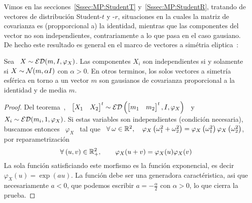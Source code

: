 Vimos   en   las  secciones~\ref{Sssec:MP:StudentT}   y~\ref{Sssec:MP:StudentR},
tratando de  vectores de  distribuci\'on Student-$t$ y  -$r$, situaciones  en la
cuales la matriz  de covarianza es (propporcional a)  la identidad, mientras que
las componentes del  vector no son independientes, contrariamente  a lo que pasa
en el caso gausiano.  De hecho este resultado es general en el marco de vectores
a sim\'etria eliptica~\cite{BilBre99, Max67}:
%
\begin{teorema}\label{Teo:MP:MaxwellHershell}
  Sea \ $X \sim \mathcal{ED}(m,I,\varphi_X)$. Las componentes $X_i$ son independientes si
  y solamente si $X  \sim \mathcal{N}(m, \alpha I)$ con $\alpha >  0$. En otros terminos,
  los  solos vectores  a  simetr\'ia esf\'erica  en  torno a  un  vector $m$  son
  gausianos de covarianza proporcional a la identidad y de media $m$.
\end{teorema}
%
\begin{proof}
  Del teorema~\cite{Teo:MP:TranformacionAfinEliptica},  \ $\begin{bmatrix} X_1 &
    X_2    \end{bmatrix}^t     \sim    \mathcal{ED}\left(    \begin{bmatrix}     m_1    &
      m_2 \end{bmatrix}^t, I, \varphi_X \right)$ \ y  \ $X_i \sim \mathcal{ED}( m_i , 1 ,
  \varphi_X)$.  Si  estas variables son  independientes (condici\'on necesaria),
  buscamos entonces  \ $\varphi_X$ \ tal  que \ $\forall \:  \omega \in \mathbb{R}^2,
  \quad  \varphi_X\left(  \omega_1^2  +  \omega_2^2  \right)  =  \varphi_X\left(
    \omega_1^2   \right)   \varphi_X\left(    \omega_2^2   \right)$,   \ie   por
  reparametrizaci\'on
  \[
  \forall  \:   (u,v)  \in  \mathbb{R}_+^2,  \qquad   \varphi_X(u+v)  =  \varphi_X(u)
  \varphi_X(v)
  \]
  La sola funci\'on satisficiando este  morfismo es la funci\'on exponencial, es
  decir  $\varphi_X(u)  = \exp(a  u)$.  La  funci\'on  debe ser  una  generadora
  caract\'eristica, asi que necesariamente $a <  0$, que podemos escribir $a = -
  \frac{\alpha}{2}$ con $\alpha > 0$, lo que cierra la prueba.
\end{proof}

